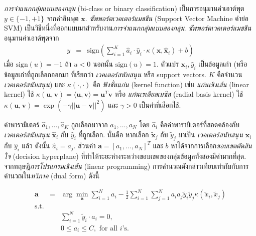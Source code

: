 \textit{การจำแนกกลุ่มแบบสองกลุ่ม} (bi-class or binary classification)
เป็นการอนุมานค่าเอาต์พุต $y \in \{-1,+1\}$ จากค่าอินพุต $\bm{x}$.
\textit{ซัพพอร์ตเวคเตอร์แมชชีน} (Support Vector Machine คำย่อ SVM) เป็นวิธีหนึ่งที่ออกแบบมาสำหรับงาน\textit{การจำแนกกลุ่มแบบสองกลุ่ม}.
\textit{ซัพพอร์ตเวคเตอร์แมชชีน}อนุมานค่าเอาต์พุตจาก
\begin{eqnarray}
y &=& \mathrm{sign}\left(\sum_{i=1}^K \hat{a}_i \cdot \hat{y}_i \cdot \kappa(\bm{x}, \bm{\hat{x}}_i) + b \right)
\label{eq: opt svm inference}
\end{eqnarray}
เมื่อ 
$\mathrm{sign}(u) = -1$ ถ้า $u < 0$ นอกนั้น $\mathrm{sign}(u) = 1$.
ตัวแปร $\bm{\hat{x}}_i, \hat{y}_i$ เป็นข้อมูลเก่า (หรือข้อมูลเก่าที่ถูกเลือกออกมา ที่เรียกว่า \textit{เวคเตอร์สนับสนุน} หรือ support vectors\cite{CL2011}. 
$K$ คือจำนวน\textit{เวคเตอร์สนับสนุน})
และ
$\kappa(\cdot, \cdot)$ คือ \textit{ฟังชั่นแก่น} (kernel function)
เช่น 
\textit{แก่นเชิงเส้น} (linear kernel) ใช้
$\kappa(\bm{u}, \bm{v}) = \langle \bm{u}, \bm{v} \rangle = \bm{u}^T \bm{v}$
หรือ
\textit{แก่นเรเดียลเบซิส} (radial basis kernel) ใช้
$\kappa(\bm{u}, \bm{v}) = \exp( - \gamma || \bm{u} - \bm{v} ||^2 )$ และ $\gamma > 0$ เป็นค่าที่เลือกใช้. 

ค่าพารามิเตอร์ 
$\hat{a}_1, \ldots, \hat{a}_K$ 
ถูกเลือกมาจาก $a_1, \ldots, a_N$ 
โดย $\hat{a}_i$ คือค่าพารามิเตอร์ที่สอดคล้องกับ\textit{เวคเตอร์สนับสนุน} $\bm{\hat{x}}_i$ กับ $\hat{y}_i$ ที่ถูกเลือก.
นั่นคือ หากเลือก $\bm{\tilde{x}}_j$ กับ $\tilde{y}_j$
มาเป็น
\textit{เวคเตอร์สนับสนุน} $\bm{\hat{x}}_i$ กับ $\hat{y}_i$ 
แล้ว 
ดังนั้น $\hat{a}_i = a_j$.
ส่วนค่า $\bm{a} = [a_1, \ldots, a_N]^T$
และ $b$ หาได้จากการเลือก\textit{ขอบเขตตัดสินใจ} (decision hyperplane) ที่ทำให้ระยะห่างระหว่างขอบเขตของกลุ่มข้อมูลทั้งสองมีค่ามากที่สุด.
จากทฤษฎี\textit{การโปรแกรมเชิงเส้น} (linear programming) การคำนวณดังกล่าวเทียบเท่ากับกับการคำนวณใน\textit{ทวิภาค} (dual form) ดังนี้

%
\begin{eqnarray}
\bm{a} &=& \arg\min_{\bm{a}} \sum_{i=1}^N a_i - \frac{1}{2} \sum_{i=1}^N \sum_{j=1}^N a_i a_j \tilde{y}_i \tilde{y}_j \kappa(\tilde{x}_i, \tilde{x}_j)
\label{eq: opt SVM dual obj} \\
\mbox{s.t.} &\;& 
\nonumber \\
&\;& \sum_{i=1}^N \tilde{y}_i \cdot a_i = 0
\nonumber , \\
&\;& 0 \leq a_i \leq C, \mbox{ for all } i\mbox{'s}
\nonumber . 
\end{eqnarray}

